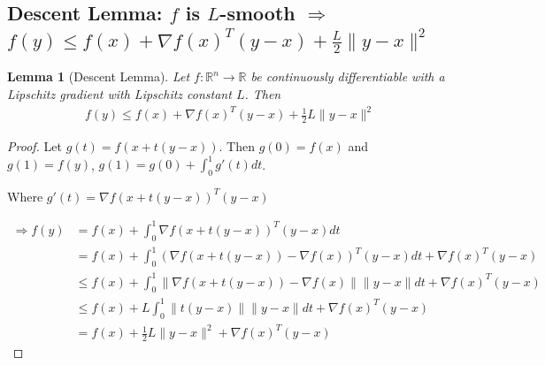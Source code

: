 \documentclass[11pt,a4paper]{article}
\newtheorem{lemma}{Lemma}
\begin{document}
\subsection{Descent Lemma: $f$ is $L$-smooth $\Rightarrow$ $f(y)\leq f(x)+\nabla f(x)^T(y-x)+\frac{L}{2}\|y-x\|^2$}
\begin{lemma}[Descent Lemma]
Let $f: \mathbb{R}^n \rightarrow \mathbb{R}$ be continuously differentiable with a Lipschitz gradient with Lipschitz constant $L$. Then
\begin{equation}
    \begin{aligned}
        f(y)\leq f(x)+\nabla f(x)^T(y-x)+\frac{1}{2}L\|y-x\|^2
    \end{aligned}
    \nonumber
\end{equation}
\end{lemma}
\begin{proof}
Let $g(t)=f(x+t(y-x))$. Then $g(0)=f(x)$ and $g(1)=f(y)$, $g(1)=g(0)+\int_0^1g'(t)dt$.

Where $g'(t)=\nabla f(x+t(y-x))^T(y-x)$

\begin{equation}
    \begin{aligned}
        \Rightarrow	f(y)&=f(x)+\int_0^1\nabla f(x+t(y-x))^T(y-x)dt\\
        &=f(x)+\int_0^1(\nabla f(x+t(y-x))-\nabla f(x))^T(y-x)dt+\nabla f(x)^T(y-x)\\
        &\leq f(x)+\int_0^1\|\nabla f(x+t(y-x))-\nabla f(x)\|\|y-x\|dt+\nabla f(x)^T(y-x)\\
        &\leq f(x)+L\int_0^1\|t(y-x)\|\|y-x\|dt+\nabla f(x)^T(y-x)\\
        &=f(x)+\frac{1}{2}L\|y-x\|^2+\nabla f(x)^T(y-x)
    \end{aligned}
    \nonumber
\end{equation}
\end{proof}
\end{document}
